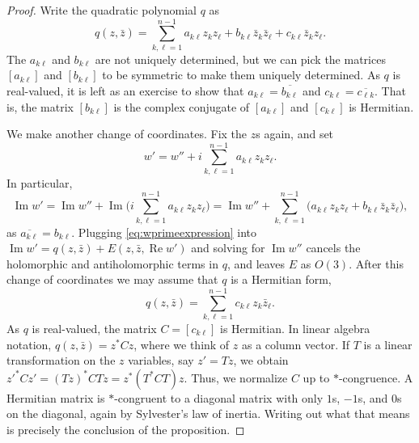 \documentclass[12pt,openany]{book}
\renewcommand{\Re}{\operatorname{Re}}
\renewcommand{\Im}{\operatorname{Im}}
\theoremstyle{plain}
\theoremstyle{remark}
\theoremstyle{definition}
\theoremstyle{exercise}
\theoremstyle{example}
\begin{document}
\begin{proof}
Write the quadratic polynomial $q$ as
\begin{equation} \label{eq:generalquadraticq}
q(z,\bar{z}) =
\sum_{k,\ell=1}^{n-1}
a_{k\ell} z_kz_\ell
+
b_{k\ell} \bar{z}_k\bar{z}_\ell
+
c_{k\ell} \bar{z}_kz_\ell .
\end{equation}
The $a_{k\ell}$ and $b_{k\ell}$ are not uniquely determined, but
we can pick the matrices $[a_{k\ell}]$ and $[b_{k\ell}]$ to be symmetric
to make them uniquely determined.
As $q$ is real-valued, it is left as an exercise to show that 
$a_{k\ell} = \overline{b_{k\ell}}$ and
$c_{k\ell} = \overline{c_{\ell k}}$.  That is, the
matrix $[b_{k\ell}]$ is the complex conjugate of $[a_{k\ell}]$ and
$[c_{k\ell}]$ is Hermitian.

We make another change of coordinates.  Fix the $z$s again, and set
\begin{equation} \label{eq:wprimeexpression}
w' = w'' + i
\sum_{k,\ell=1}^{n-1}
a_{k\ell} z_kz_\ell .
\end{equation}
In particular,
\begin{equation*}
\Im w'
= \Im w''
+ \Im \biggl(
i
\sum_{k,\ell=1}^{n-1}
a_{k\ell} z_kz_\ell
\biggr)
=
\Im w''
+
\sum_{k,\ell=1}^{n-1}
\bigl(
a_{k\ell} z_kz_\ell
+
b_{k\ell} \bar{z}_k\bar{z}_\ell
\bigr) ,
\end{equation*}
as $\overline{a_{k\ell}} = b_{k\ell}$.  Plugging
\eqref{eq:wprimeexpression} into $\Im w' = q(z,\bar{z}) + E(z,\bar{z},\Re w')$
and solving for $\Im w''$ cancels the
holomorphic and antiholomorphic terms in $q$, and leaves $E$ as $O(3)$.
After this change of coordinates we may assume
that $q$ is a Hermitian form,
\begin{equation*}
q(z,\bar{z}) = \sum_{k,\ell=1}^{n-1} c_{k\ell} z_k \bar{z}_\ell .
\end{equation*}
As $q$ is real-valued, the matrix
$C = [ c_{k\ell} ]$ is Hermitian.  In linear algebra notation,
$q(z,\bar{z}) = z^*Cz$,
where we think of $z$ as a column vector.
If $T$ is a linear transformation on the $z$ variables, say $z'=Tz$, we
obtain ${z'}^*Cz' = {(Tz)}^*CTz = z^* ( T^*CT) z$.  Thus, we normalize $C$
up to $*$-congruence.  A Hermitian matrix
is $*$-congruent to a diagonal matrix with only $1$s, $-1$s, and $0$s on the
diagonal, again by Sylvester's law of inertia.  Writing out what that means is precisely the conclusion of the
proposition.
\end{proof}
\end{document}
